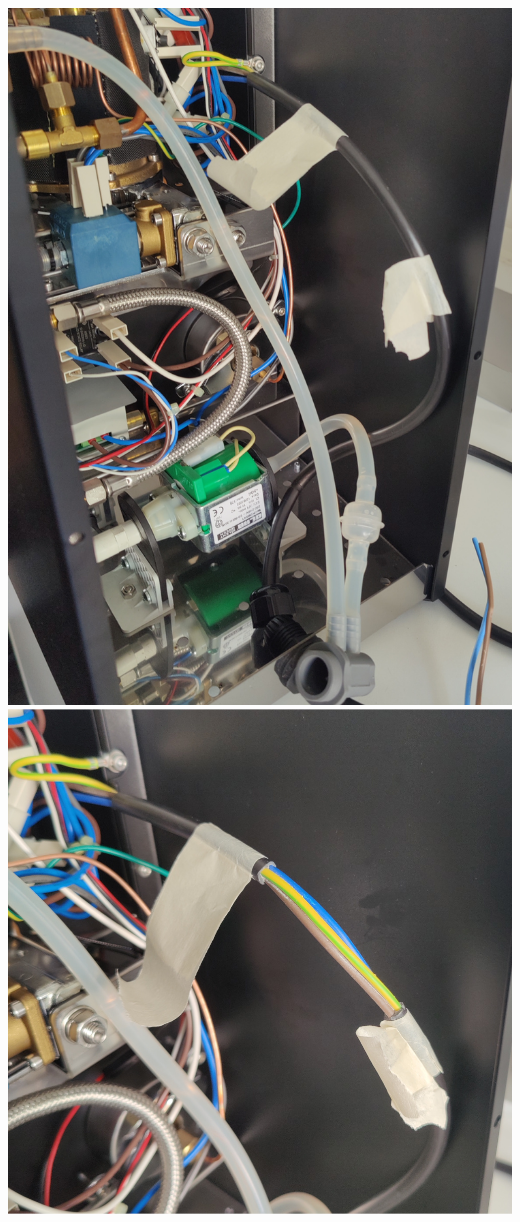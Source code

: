 \documentclass[]{article}
\begin{document}
\begin{minipage}[t]{0.4\linewidth}
	\vspace{0pt}
	\includegraphics[width=\linewidth]{images/03_installation/11_unscrew_eucableclamp_mark_cutting.jpg}
	\includegraphics[width=\linewidth]{images/03_installation/12_remove_shielding.jpg}

\end{minipage}
\end{document}
